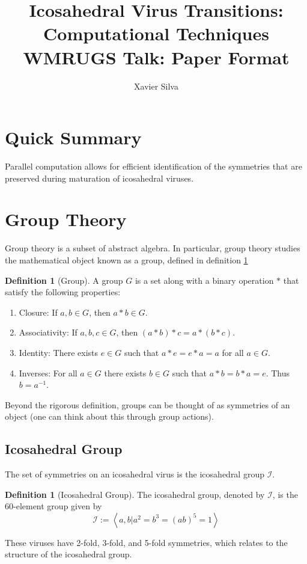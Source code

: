 \documentclass[a4paper,10pt]{article}
\title{Icosahedral Virus Transitions: Computational Techniques \\ \large WMRUGS Talk: Paper Format}
\author{Xavier Silva}
\theoremstyle{plain}
\theoremstyle{definition}
\newtheorem{Definition}[Theorem]{Definition}
\theoremstyle{remark}
\newcommand{\generatedby}[1]{\left\langle#1\right\rangle}
\begin{document}
\maketitle
\tableofcontents

\section{Quick Summary}
Parallel computation allows for efficient identification of the symmetries that are preserved during maturation of icosahedral viruses.

\section{Group Theory}
Group theory is a subset of abstract algebra.
In particular, group theory studies the mathematical object known as a group, defined in definition \ref{def:group}
\begin{Definition}[Group]
    \label{def:group}
    A group \(G\) is a set along with a binary operation \(*\) that satisfy the following properties:
    \begin{enumerate}
        \item Closure: If \(a, b \in G\), then \(a*b \in G\).
        \item Associativity: If \(a, b, c \in G\), then \((a*b)*c = a*(b*c)\).
        \item Identity: There exists \(e \in G\) such that \(a*e = e*a = a\) for all \(a \in G\).
        \item Inverses: For all \(a \in G\) there exists \(b \in G\) such that \(a*b = b*a = e\). Thus \(b = a^{-1}\).
    \end{enumerate}
\end{Definition}
Beyond the rigorous definition, groups can be thought of as symmetries of an object (one can think about this through group actions).

\subsection{Icosahedral Group}
The set of symmetries on an icosahedral virus is the icosahedral group \(\mathcal{I}\).
\begin{Definition}[Icosahedral Group]
    The icosahedral group, denoted by \(\mathcal{I}\), is the 60-element group given by \[\mathcal{I} := \generatedby{a, b | a^2 = b^3 = (ab)^5 = 1}\]
\end{Definition}
These viruses have 2-fold, 3-fold, and 5-fold symmetries, which relates to the structure of the icosahedral group.
\end{document}

